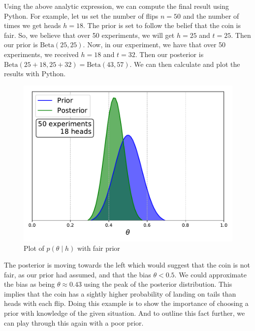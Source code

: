 \documentclass[12pt,twoside]{report}   %
\begin{document}
Using the above analytic expression, we can compute the final result using Python. For example, let us set the number of flips $n = 50$ and the number of times we get heads $h = 18$. The prior is set to follow the belief that the coin is fair. So, we believe that over 50 experiments, we will get $h=25$ and $t=25$. Then our prior is $\text{Beta}(25,25)$. Now, in our experiment, we have that over 50 experiments, we received $h=18$ and $t=32$. Then our posterior is $\text{Beta}(25+18,25+32) = \text{Beta}(43,57)$. We can then calculate and plot the results with Python.
\begin{figure}[H]
\centering
\includegraphics[width = 5in]{Final.pdf}
\caption{Plot of $p(\theta\mid h)$ with fair prior}
\label{figCoinFlipGood}
\end{figure}
\pagebreak
The posterior is moving towards the left which would suggest that the coin is not fair, as our prior had assumed, and that the bias $\theta < 0.5$. We could approximate the bias as being $\theta \approx 0.43$ using the peak of the posterior distribution. This implies that the coin has a sightly higher probability of landing on tails than heads with each flip. Doing this example is to show the importance of choosing a prior with knowledge of the given situation. And to outline this fact further, we can play through this again with a poor prior.
\end{document}
